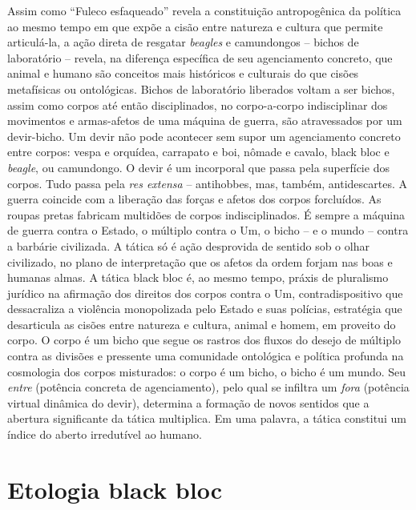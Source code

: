 Assim como ``Fuleco esfaqueado'' revela a constituição antropogênica da
política ao mesmo tempo em que expõe a cisão entre natureza e cultura
que permite articulá-la, a ação direta de resgatar \emph{beagles }e
camundongos -- bichos de laboratório -- revela, na diferença específica
de seu agenciamento concreto, que animal e humano são conceitos mais
históricos e culturais do que cisões metafísicas ou ontológicas. Bichos
de laboratório liberados voltam a ser bichos, assim como corpos até
então disciplinados, no corpo-a-corpo indisciplinar dos movimentos e
armas-afetos de uma máquina de guerra, são atravessados por um
devir-bicho. Um devir não pode acontecer sem supor um agenciamento
concreto entre corpos: vespa e orquídea, carrapato e boi, nômade e
cavalo, black bloc e \emph{beagle}, ou camundongo. O devir é um
incorporal que passa pela superfície dos corpos. Tudo passa pela
\emph{res extensa} -- antihobbes, mas, também, antidescartes. A guerra
coincide com a liberação das forças e afetos dos corpos forcluídos. As
roupas pretas fabricam multidões de corpos indisciplinados. É sempre a
máquina de guerra contra o Estado, o múltiplo contra o Um, o bicho -- e
o mundo -- contra a barbárie civilizada. A tática só é ação desprovida
de sentido sob o olhar civilizado, no plano de interpretação que os
afetos da ordem forjam nas boas e humanas almas. A tática black bloc é,
ao mesmo tempo, práxis de pluralismo jurídico na afirmação dos direitos
dos corpos contra o Um, contradispositivo que dessacraliza a violência
monopolizada pelo Estado e suas polícias, estratégia que desarticula as
cisões entre natureza e cultura, animal e homem, em proveito do corpo. O
corpo é um bicho que segue os rastros dos fluxos do desejo de múltiplo
contra as divisões e pressente uma comunidade ontológica e política
profunda na cosmologia dos corpos misturados: o corpo é um bicho, o
bicho é um mundo. Seu \emph{entre }(potência concreta de
agenciamento)\emph{,} pelo qual se infiltra um \emph{fora }(potência
virtual dinâmica do devir), determina a formação de novos sentidos que a
abertura significante da tática multiplica. Em uma palavra, a tática
constitui um índice do aberto irredutível ao humano.

\chapter{Etologia black bloc}


